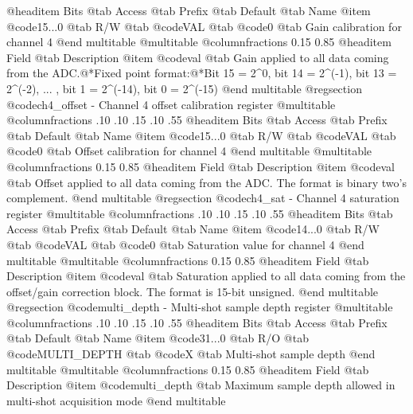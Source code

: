 @headitem Bits @tab Access @tab Prefix @tab Default @tab Name
@item @code{15...0}
@tab R/W @tab
@code{VAL}
@tab @code{0} @tab 
Gain calibration for channel 4
@end multitable
@multitable @columnfractions 0.15 0.85
@headitem Field @tab Description
@item @code{val} @tab Gain applied to all data coming from the ADC.@*Fixed point format:@*Bit 15 = 2^0, bit 14 = 2^(-1), bit 13 = 2^(-2), ... , bit 1 = 2^(-14), bit 0 = 2^(-15)
@end multitable
@regsection @code{ch4_offset} - Channel 4 offset calibration register
@multitable @columnfractions .10 .10 .15 .10 .55
@headitem Bits @tab Access @tab Prefix @tab Default @tab Name
@item @code{15...0}
@tab R/W @tab
@code{VAL}
@tab @code{0} @tab 
Offset calibration for channel 4
@end multitable
@multitable @columnfractions 0.15 0.85
@headitem Field @tab Description
@item @code{val} @tab Offset applied to all data coming from the ADC. The format is binary two's complement.
@end multitable
@regsection @code{ch4_sat} - Channel 4 saturation register
@multitable @columnfractions .10 .10 .15 .10 .55
@headitem Bits @tab Access @tab Prefix @tab Default @tab Name
@item @code{14...0}
@tab R/W @tab
@code{VAL}
@tab @code{0} @tab 
Saturation value for channel 4
@end multitable
@multitable @columnfractions 0.15 0.85
@headitem Field @tab Description
@item @code{val} @tab Saturation applied to all data coming from the offset/gain correction block. The format is 15-bit unsigned.
@end multitable
@regsection @code{multi_depth} - Multi-shot sample depth register
@multitable @columnfractions .10 .10 .15 .10 .55
@headitem Bits @tab Access @tab Prefix @tab Default @tab Name
@item @code{31...0}
@tab R/O @tab
@code{MULTI_DEPTH}
@tab @code{X} @tab 
Multi-shot sample depth
@end multitable
@multitable @columnfractions 0.15 0.85
@headitem Field @tab Description
@item @code{multi_depth} @tab Maximum sample depth allowed in multi-shot acquisition mode
@end multitable

